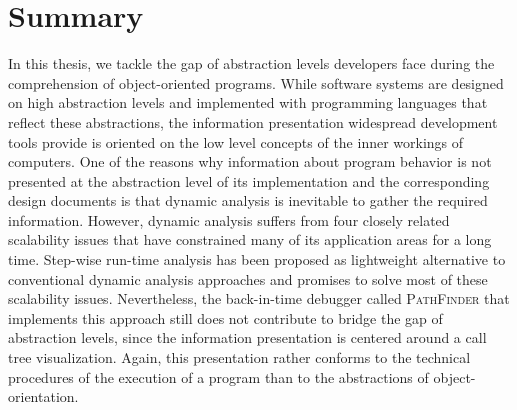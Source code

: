 \section{Summary}
\label{s:ConclusionsSummary}
In this thesis, we tackle the gap of abstraction levels developers face during the comprehension of object-oriented programs.
While software systems are designed on high abstraction levels and implemented with programming languages that reflect these abstractions, the information presentation widespread development tools provide is oriented on the low level concepts of the inner workings of computers.
One of the reasons why information about program behavior is not presented at the abstraction level of its implementation and the corresponding design documents is that dynamic analysis is inevitable to gather the required information.
However, dynamic analysis suffers from four closely related scalability issues that have constrained many of its application areas for a long time.
Step-wise run-time analysis has been proposed as lightweight alternative to conventional dynamic analysis approaches and promises to solve most of these scalability issues.
Nevertheless, the back-in-time debugger called \textsc{PathFinder} that implements this approach still does not contribute to bridge the gap of abstraction levels, since the information presentation is centered around a call tree visualization.
Again, this presentation rather conforms to the technical procedures of the execution of a program than to the abstractions of object-orientation.
